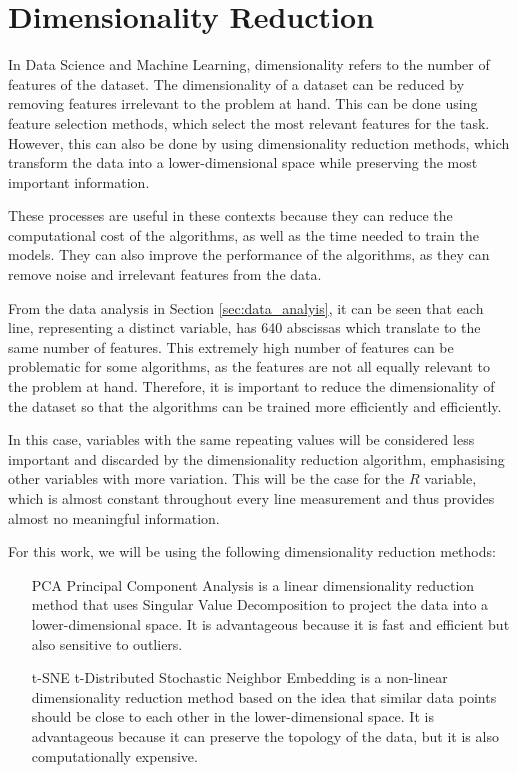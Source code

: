 \section{Dimensionality Reduction}\label{sec:dim_reduction}
In Data Science and Machine Learning, dimensionality refers to the number of features of the dataset. The dimensionality of a dataset can be reduced by removing features irrelevant to the problem at hand. This can be done using feature selection methods, which select the most relevant features for the task. However, this can also be done by using dimensionality reduction methods, which transform the data into a lower-dimensional space while preserving the most important information.

These processes are useful in these contexts because they can reduce the computational cost of the algorithms, as well as the time needed to train the models. They can also improve the performance of the algorithms, as they can remove noise and irrelevant features from the data.

From the data analysis in Section \ref{sec:data_analyis}, it can be seen that each line, representing a distinct variable, has 640 abscissas which translate to the same number of features. This extremely high number of features can be problematic for some algorithms, as the features are not all equally relevant to the problem at hand. Therefore, it is important to reduce the dimensionality of the dataset so that the algorithms can be trained more efficiently and efficiently. 

In this case, variables with the same repeating values will be considered less important and discarded by the dimensionality reduction algorithm, emphasising other variables with more variation. This will be the case for the $R$ variable, which is almost constant throughout every line measurement and thus provides almost no meaningful information.

For this work, we will be using the following dimensionality reduction methods:

\begin{itemize}
    \item[PCA] Principal Component Analysis is a linear dimensionality reduction method that uses Singular Value Decomposition to project the data into a lower-dimensional space. It is advantageous because it is fast and efficient but also sensitive to outliers.
    \item[t-SNE] t-Distributed Stochastic Neighbor Embedding is a non-linear dimensionality reduction method based on the idea that similar data points should be close to each other in the lower-dimensional space. It is advantageous because it can preserve the topology of the data, but it is also computationally expensive.
\end{itemize}


